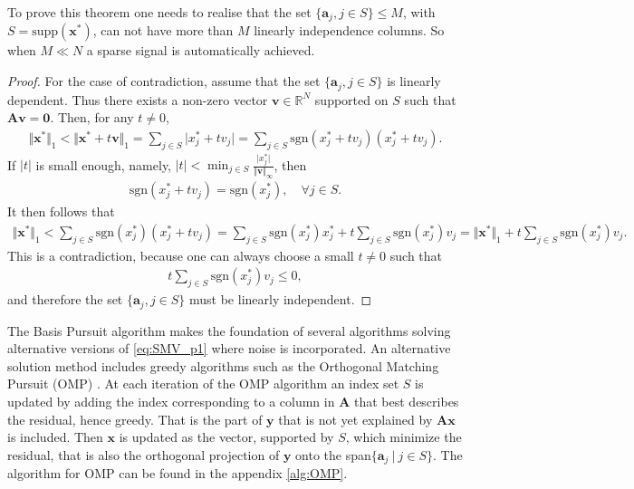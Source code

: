To prove this theorem one needs to realise that the set $\lbrace \mathbf{a}_j, j \in S \rbrace \leq M$, with $S = \text{supp}(\mathbf{x}^\ast)$, can not have more than $M$ linearly independence columns. 
So when $M \ll N$ a sparse signal is automatically achieved.
\begin{proof}
For the case of contradiction, assume that the set $\lbrace \mathbf{a}_j, j \in S \rbrace$ is linearly dependent. 
Thus there exists a non-zero vector $\mathbf{v} \in \mathbb{R}^N$ supported on $S$ such that $\mathbf{Av} = \textbf{0}$. Then, for any $t \neq 0$,
\begin{align*}
\Vert \mathbf{x}^\ast \Vert_1 < \Vert \mathbf{x}^\ast + t \mathbf{v} \Vert_1 = \sum_{j \in S} \vert x_j^\ast + t v_j \vert = \sum_{j \in S} \text{sgn}(x_j^\ast + t v_j )(x_j^\ast + t v_j ).
\end{align*}
If $|t|$ is small enough, namely, $|t| < \min_{j \in S} \frac{\vert x_j^\ast \vert}{\Vert \mathbf{v} \Vert_{\infty}}$, then
\begin{align*}
\text{sgn}(x_j^\ast + t v_j) = \text{sgn}(x_j^\ast), \quad \forall j \in S.
\end{align*}
It then follows that
\begin{align*}
\Vert \textbf{x}^{\ast} \Vert_1 < \sum_{j \in S} \text{sgn}(x_j^{\ast})(x_j^{\ast} + t v_j ) = \sum_{j \in S} \text{sgn}(x_j^{\ast})x_j^{\ast} + t \sum_{j \in S} \text{sgn}(x_j^{\ast})v_j = \Vert \textbf{x}^{\ast} \Vert_1 + t \sum_{j \in S} \text{sgn}(x_j^{\ast})v_j.
\end{align*}
This is a contradiction, because one can always choose a small $t \neq 0$ such that 
\begin{align*}
t \sum_{j \in S} \text{sgn}(x_j^\ast)v_j \leq 0,
\end{align*}
and therefore the set $\lbrace \mathbf{a}_j, j \in S \rbrace$ must be linearly independent.
\end{proof}
The Basis Pursuit algorithm makes the foundation of several algorithms solving alternative versions of \eqref{eq:SMV_p1} where noise is incorporated. 
An alternative solution method includes greedy algorithms such as the Orthogonal Matching Pursuit (OMP) \cite[P. 65]{FR}. 
At each iteration of the OMP algorithm an index set $S$ is updated by adding the index corresponding to a column in $\mathbf{A}$ that best describes the residual, hence greedy.
That is the part of $\mathbf{y}$ that is not yet explained by $\mathbf{Ax}$ is included. 
Then $\mathbf{x}$ is updated as the vector, supported by $S$, which minimize the residual, that is also the orthogonal projection of $\mathbf{y}$ onto the span$\lbrace \mathbf{a}_j \ \vert \ j \in S \rbrace$. The algorithm for OMP can be found in the appendix \ref{alg:OMP}.

